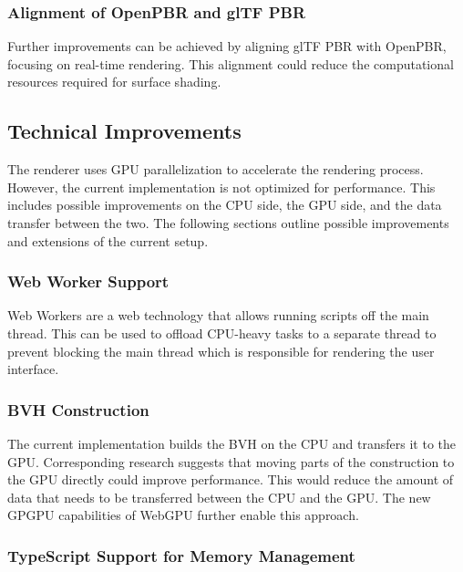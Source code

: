\subsubsection*{Alignment of OpenPBR and glTF PBR}

Further improvements can be achieved by aligning \gls{glTF} \gls{PBR} with \gls{OpenPBR}, focusing on real-time rendering. This alignment could reduce the computational resources required for surface shading.

\subsection*{Technical Improvements}

The renderer uses \gls{GPU} parallelization to accelerate the rendering process. However, the current implementation is not optimized for performance. This includes possible improvements on the \gls{CPU} side, the \gls{GPU} side, and the data transfer between the two. The following sections outline possible improvements and extensions of the current setup.

\subsubsection*{Web Worker Support}

Web Workers are a web technology that allows running scripts off the main thread. This can be used to offload \gls{CPU}-heavy tasks to a separate thread to prevent blocking the main thread which is responsible for rendering the user interface.

\subsubsection*{BVH Construction}
\label{sec:bvhConstructionDiscussion}

The current implementation builds the \gls{BVH} on the \gls{CPU} and transfers it to the \gls{GPU}. Corresponding research \cite{lauterbach2009GPUbvh} suggests that moving parts of the construction to the \gls{GPU} directly could improve performance. This would reduce the amount of data that needs to be transferred between the \gls{CPU} and the \gls{GPU}. The new \gls{GPGPU} capabilities of \gls{WebGPU} further enable this approach.

\subsubsection*{TypeScript Support for Memory Management}

